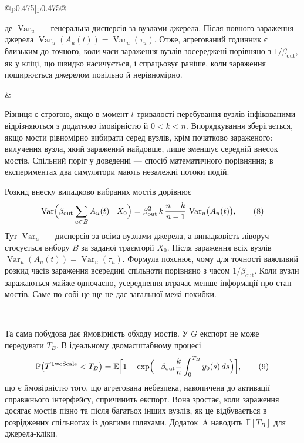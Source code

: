 \documentclass[11pt]{article}
\newcommand{\TS}{\textnormal{TwoScale}}
\begin{document}
\begin{longtable}{@{}p{0.475\textwidth}|p{0.475\textwidth}@{}}
\begin{minipage}[t]{\linewidth}
де $\operatorname{Var}_u$ --- генеральна дисперсія за вузлами джерела. Після повного зараження джерела $\operatorname{Var}_u(A_u(t))=\operatorname{Var}_u(\tau_u)$. Отже, агрегований годинник є близьким до точного, коли часи зараження вузлів зосереджені порівняно з $1/\beta_{\mathrm{out}}$, як у кліці, що швидко насичується, і спрацьовує раніше, коли зараження поширюється джерелом повільно й нерівномірно.
\end{minipage} &
\begin{minipage}[t]{\linewidth}
Різниця є строгою, якщо в момент $t$ тривалості перебування вузлів інфікованими відрізняються з додатною імовірністю й $0<k<n$. Впорядкування зберігається, якщо мости рівномірно вибирати серед вузлів, крім початково зараженого: вилучення вузла, який заражений найдовше, лише зменшує середній внесок мостів. Спільний поріг у доведенні --- спосіб математичного порівняння; в експериментах два симулятори мають незалежні потоки подій.
\par Розкид внеску випадково вибраних мостів дорівнює
\begin{equation*}\operatorname{Var}\Bigl(\beta_{\mathrm{out}}\sum_{u\in B}A_u(t)\Bigm| X_0\Bigr)=\beta_{\mathrm{out}}^2\,k\,\frac{n-k}{n-1}\,\operatorname{Var}_u\bigl(A_u(t)\bigr),\tag{8}
\end{equation*}
Тут $\operatorname{Var}_u$ --- дисперсія за всіма вузлами джерела, а випадковість ліворуч стосується вибору $B$ за заданої траєкторії $X_0$. Після зараження всіх вузлів $\operatorname{Var}_u(A_u(t))=\operatorname{Var}_u(\tau_u)$. Формула пояснює, чому для точності важливий розкид часів зараження всередині спільноти порівняно з часом $1/\beta_{\mathrm{out}}$. Коли вузли заражаються майже одночасно, усереднення втрачає менше інформації про стан мостів. Саме по собі це ще не дає загальної межі похибки.
\end{minipage} \\[5mm]
\begin{minipage}[t]{\linewidth}
Та сама побудова дає ймовірність обходу мостів. У $G$ експорт не може передувати $T_B$. В ідеальному двомасштабному процесі
\begin{equation*}\mathbb{P}\bigl(T^{\TS}<T_B\bigr)=\mathbb{E}\Bigl[1-\exp\Bigl(-\beta_{\mathrm{out}}\frac{k}{n}\int_0^{T_B}y_0(s)\,ds\Bigr)\Bigr],\tag{9}
\end{equation*}
що є ймовірністю того, що агрегована небезпека, накопичена до активації справжнього інтерфейсу, спричинить експорт. Вона зростає, коли зараження досягає мостів пізно та після багатьох інших вузлів, як це відбувається в розріджених спільнотах із довгими шляхами. Додаток~A наводить $\mathbb{E}[T_B]$ для джерела-кліки.

\end{minipage}
\end{longtable}
\end{document}
